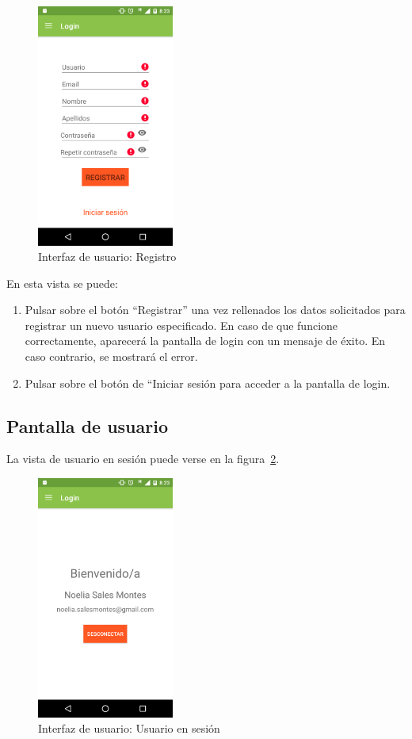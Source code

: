 \begin{figure}[htbp]
  \centering
  \includegraphics[width=0.4\textwidth]{cap5/img/captura_14}
  \caption{Interfaz de usuario: Registro}
  \label{fig:captura_14}
\end{figure}

En esta vista se puede:
\begin{enumerate}
\item Pulsar sobre el botón ``Registrar'' una vez rellenados los datos
  solicitados para registrar un nuevo usuario especificado. En caso de que
  funcione correctamente, aparecerá la pantalla de login con un mensaje de
  éxito. En caso contrario, se mostrará el error.
\item Pulsar sobre el botón de ``Iniciar sesión para acceder a la pantalla de
  login.
\end{enumerate}

\subsection{Pantalla de usuario}

La vista de usuario en sesión puede verse en la figura~\ref{fig:captura_15}.

\begin{figure}[htbp]
  \centering
  \includegraphics[width=0.4\textwidth]{cap5/img/captura_15}
  \caption{Interfaz de usuario: Usuario en sesión}
  \label{fig:captura_15}
\end{figure}

